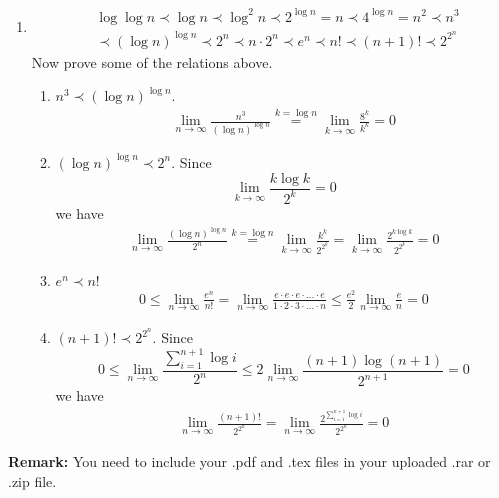 \documentclass[12pt,a4paper,UTF8]{article}
\makeatletter
\newtheorem*{solution}{Solution}
\theoremstyle{definition}
\renewenvironment{solution}[1][Solution] {\par\pushQED{\qed}\normalfont\topsep6\p@\@plus6\p@\relax\trivlist\item[\hskip\labelsep\bfseries#1\@addpunct{.}]\ignorespaces}{\popQED\endtrivlist\@endpefalse} \makeatother
\makeatother
\begin{document}
\begin{enumerate}
    \begin{solution}
		\begin{align*}
		&\log\log n \prec \log n \prec \log^2 n \prec 2^{\log n} = n \prec 4^{\log n} = n^2 \prec n^3\\
		&\prec (\log n)^{\log n} \prec 2^n \prec n\cdot 2^n \prec e^n \prec n! \prec (n+1)! \prec 2^{2^{n}}
		\end{align*}
		Now prove some of the relations above.
		\begin{enumerate}
			\item
			$ n^3 \prec (\log n)^{\log n} $.
			\begin{align*}
			\lim\limits_{n \to \infty} \frac{n^3}{(\log n)^{\log n}} \overset{k = \log n}{=} \lim\limits_{k \to \infty} \frac{8^k}{k^k} = 0
			\end{align*}
			\item
			$ (\log n)^{\log n} \prec 2^n $. Since
			$$\lim\limits_{k \to \infty} \frac{k \log k}{2^k} = 0$$
			we have
			\begin{align*}
			\lim\limits_{n \to \infty} \frac{(\log n)^{\log n}}{2^n} \overset{k = \log n}{=} \lim\limits_{k \to \infty} \frac{k^k}{2^{2^k}} = \lim\limits_{k \to \infty} \frac{2^{k \log k}}{2^{2^k}} = 0
			\end{align*}
			\item
			$ e^n \prec n! $
			\begin{align*}
			0 \leq \lim\limits_{n \to \infty} \frac{e^n}{n!} = \lim\limits_{n \to \infty} \frac{e\cdot e\cdot e\cdot ... \cdot e}{1\cdot 2\cdot 3 \cdot ... \cdot n } \leq \frac{e^2}{2}\lim\limits_{n \to \infty}\frac{e}{n} = 0
			\end{align*}
			\item
			$ (n+1)! \prec 2^{2^{n}} $. Since
			$$0\leq \lim\limits_{n \to \infty} \frac{\sum_{i = 1}^{n+1} \log i}{2^n} \leq 2\lim\limits_{n \to \infty} \frac{(n+1)\log(n+1)}{2^{n+1}} = 0$$
			we have
			\begin{align*}
			\lim\limits_{n \to \infty} \frac{(n+1)!}{2^{2^{n}}} = \lim\limits_{n \to \infty} \frac{2^{\sum_{i = 1}^{n+1} \log i}}{2^{2^{n}}} = 0
			\end{align*}
		\end{enumerate}
	\end{solution}

\end{enumerate}

\vspace{20pt}

\textbf{Remark:} You need to include your .pdf and .tex files in your uploaded .rar or .zip file.

\end{document}
